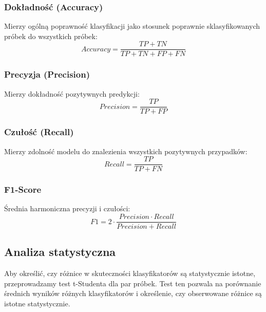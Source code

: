 \documentclass[runningheads]{llncs}
\begin{document}
\subsubsection{Dokładność (Accuracy)}
Mierzy ogólną poprawność klasyfikacji jako stosunek poprawnie sklasyfikowanych próbek do wszystkich próbek:
\begin{equation}
    Accuracy = \frac{TP + TN}{TP + TN + FP + FN}
\end{equation}

\subsubsection{Precyzja (Precision)}
Mierzy dokładność pozytywnych predykcji:
\begin{equation}
    Precision = \frac{TP}{TP + FP}
\end{equation}

\subsubsection{Czułość (Recall)}
Mierzy zdolność modelu do znalezienia wszystkich pozytywnych przypadków:
\begin{equation}
    Recall = \frac{TP}{TP + FN}
\end{equation}

\subsubsection{F1-Score}
Średnia harmoniczna precyzji i czułości:
\begin{equation}
    F1 = 2 \cdot \frac{Precision \cdot Recall}{Precision + Recall}
\end{equation}

\subsection{Analiza statystyczna}
Aby określić, czy różnice w skuteczności klasyfikatorów są statystycznie istotne, przeprowadzamy test t-Studenta dla par próbek. Test ten pozwala na porównanie średnich wyników różnych klasyfikatorów i określenie, czy obserwowane różnice są istotne statystycznie.



\begin{credits}

\end{credits}
%
%
%
% 
% 
%


\end{document}
